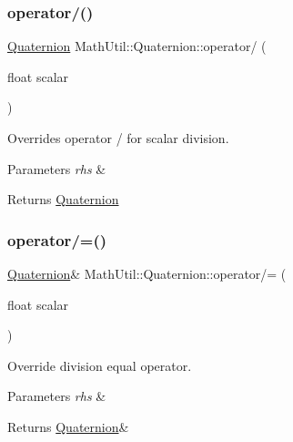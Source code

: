 \subsubsection{\texorpdfstring{operator/()}{operator/()}}
{\footnotesize\ttfamily \hyperlink{structMathUtil_1_1Quaternion}{Quaternion} Math\+Util\+::\+Quaternion\+::operator/ (\begin{DoxyParamCaption}\item[{float}]{scalar }\end{DoxyParamCaption})\hspace{0.3cm}{\ttfamily [inline]}}



Overrides operator / for scalar division. 


\begin{DoxyParams}{Parameters}
{\em rhs} & \\
\hline
\end{DoxyParams}
\begin{DoxyReturn}{Returns}
\hyperlink{structMathUtil_1_1Quaternion}{Quaternion} 
\end{DoxyReturn}
\mbox{\label{structMathUtil_1_1Quaternion_ac585108f7346eb49bb379fd07035e5b9}} 
\subsubsection{\texorpdfstring{operator/=()}{operator/=()}}
{\footnotesize\ttfamily \hyperlink{structMathUtil_1_1Quaternion}{Quaternion}\& Math\+Util\+::\+Quaternion\+::operator/= (\begin{DoxyParamCaption}\item[{float}]{scalar }\end{DoxyParamCaption})\hspace{0.3cm}{\ttfamily [inline]}}



Override division equal operator. 


\begin{DoxyParams}{Parameters}
{\em rhs} & \\
\hline
\end{DoxyParams}
\begin{DoxyReturn}{Returns}
\hyperlink{structMathUtil_1_1Quaternion}{Quaternion}\& 
\end{DoxyReturn}
\mbox{\label{structMathUtil_1_1Quaternion_a0db72410da8c9e488a6b32694d2e56df}} 
